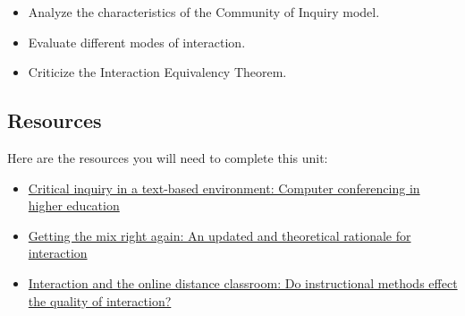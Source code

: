\documentclass[
]{book}
\providecommand{\tightlist}{%
  \setlength{\itemsep}{0pt}\setlength{\parskip}{0pt}}
\begin{document}
\begin{itemize}
\tightlist
\item
  Analyze the characteristics of the Community of Inquiry model.
\item
  Evaluate different modes of interaction.
\item
  Criticize the Interaction Equivalency Theorem.
\end{itemize}

\hypertarget{resources-2}{%
\subsection*{Resources}\label{resources-2}}

Here are the resources you will need to complete this unit:

\begin{itemize}
\tightlist
\item
  \href{https://www-sciencedirect-com.twu.idm.oclc.org/science/article/pii/S1096751600000166}{Critical inquiry in a text-based environment: Computer conferencing in higher education}\\
\item
  \href{http://www.irrodl.org/index.php/irrodl/article/view/149/230}{Getting the mix right again: An updated and theoretical rationale for interaction}\\
\item
  \href{https://rdcu.be/cKSGf}{Interaction and the online distance classroom: Do instructional methods effect the quality of interaction?}
\end{itemize}
\end{document}
